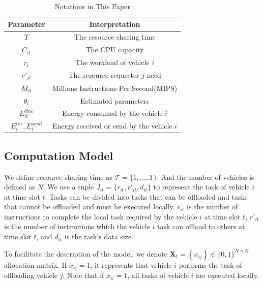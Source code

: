 \documentclass[conference]{IEEEtran}
\begin{document}
\begin{table}[]
	\centering
	\caption{Notations in This Paper}
	\begin{tabular}{|c|c|}
		\hline
		Parameter    &    Interpretation\\
		\hline
		
		$T$	          & The resource sharing time   \\
		$C_{it}$      &   The CPU capacity    \\
		$r_i $   &   The workload of vehicle $i$ \\
		$r'_{jt} $ 	  &   The resource requester $j$ need    \\
		$M_{it}$      &   Millions Instructions Per Second(MIPS)   \\
		$\theta _i   $      &  Estimated parameters   \\
		
		$E^{blnc}_{it}$   &   Energy consumed by the vehicle $i$  \\
		
		$E^{rec}_i, E^{send}_i$ & Energy received or send by the vehicle $i$  \\
		
		
		\hline
	\end{tabular}
\end{table}

\subsection{Computation Model}
We define resource sharing time as $ \mathcal{T}=\{1, \ldots, T \}$. 
And the number of vehicles is defined as $N$. 
We use a tuple $J_{it} = \{r_ {it}, r'_ {it}, d_{it}\}$ to represent the task of vehicle $i$ at time slot $t$.
Tasks can be divided into tasks that can be offloaded and tasks that cannot be offloaded and must be executed locally. 
$r_ {it}$ is the number of instructions to complete the local task required by the vehicle $i$ at time slot $t$, 
$r'_ {it}$ is the number of instructions which  the vehicle $i$ task can offload to others at time slot $t$, 
and $d_{it}$ is the task's data size.

To facilitate the description of the model, we denote $\mathbf{X}_{t}=\left\{x_{i j}\right\} \in\{0,1\}^{N \times N}$ allocation matrix. If $x_{ij}=1$, it represents that vehicle $i$ performs the task of offloading vehicle $j$. Note that if $x_{ii}=1$, all tasks of vehicle $i$ are executed locally. 
\end{document}
